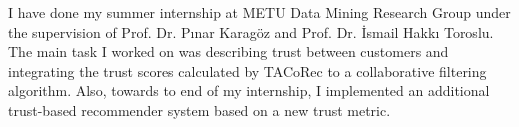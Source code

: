 I have done my summer internship at METU Data Mining Research Group under the supervision of Prof. Dr. Pınar Karagöz and Prof. Dr. İsmail Hakkı Toroslu. The main task I worked on was describing trust between customers and integrating the trust scores calculated by TACoRec\cite{Tacorec} to a collaborative filtering algorithm. Also, towards to end of my internship, I implemented an additional trust-based recommender system based on a new trust metric.